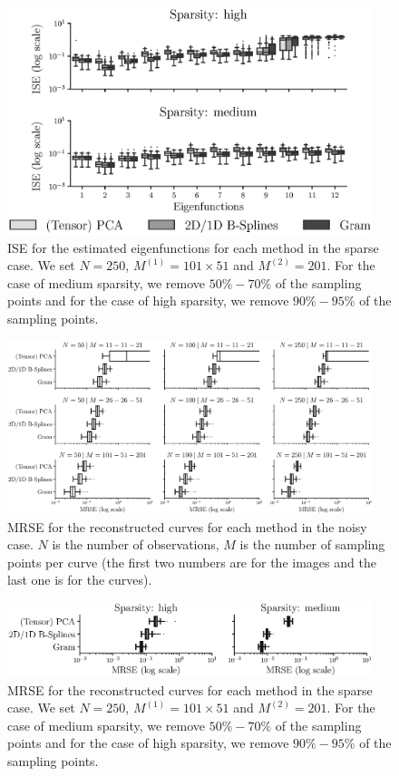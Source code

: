 \begin{figure}
     \centering
    \includegraphics[width=0.95\textwidth]{figures/ISE_sparse.eps}
    \caption{ISE for the estimated eigenfunctions for each method in the sparse case. We set $N = 250$, $M^{(1)} = 101 \times 51$ and $M^{(2)} = 201$. For the case of medium sparsity, we remove $50\%-70\%$ of the sampling points and for the case of high sparsity, we remove $90\%-95\%$ of the sampling points.}
    \label{fig:ise_mfd_1d_sparse}
\end{figure}


\begin{figure}
     \centering
     \includegraphics[width=0.95\textwidth]{figures/MRSE_noise.eps}
    \caption{MRSE for the reconstructed curves for each method in the noisy case. $N$ is the number of observations, $M$ is the number of sampling points per curve (the first two numbers are for the images and the last one is for the curves).}
    \label{fig:mise_mfd_1d_noise}
\end{figure}

\begin{figure}
     \centering
     \includegraphics[width=0.95\textwidth]{figures/MRSE_sparse.eps}
    \caption{MRSE for the reconstructed curves for each method in the sparse case. We set $N = 250$, $M^{(1)} = 101 \times 51$ and $M^{(2)} = 201$. For the case of medium sparsity, we remove $50\%-70\%$ of the sampling points and for the case of high sparsity, we remove $90\%-95\%$ of the sampling points.}
    \label{fig:mise_mfd_1d_sparse}
\end{figure}

